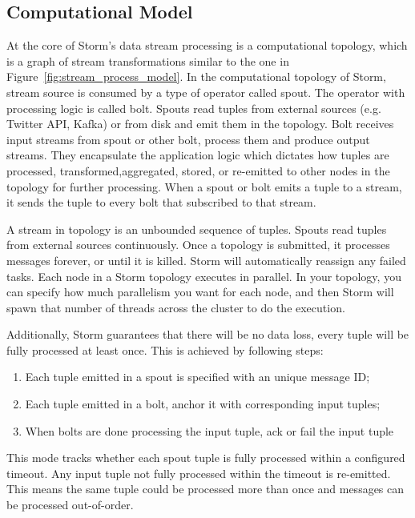 \subsection{Computational Model}

At the core of Storm's data stream processing is a computational topology, which is a graph of stream transformations similar to the one in Figure~\ref{fig:stream_process_model}. In the computational topology of Storm, stream source is consumed by a type of operator called spout. The operator with processing logic is called bolt. Spouts read tuples from external sources (e.g. Twitter API, Kafka) or from disk and emit them in the topology. Bolt receives input streams from spout or other bolt, process them and produce output streams. They encapsulate the application logic which dictates how tuples are processed, transformed,aggregated, stored, or re-emitted to other nodes in the topology for further processing. When a spout or bolt emits a tuple to a stream, it sends the tuple to every bolt that subscribed to that stream.

A stream in topology is an unbounded sequence of tuples. Spouts read tuples from external sources continuously. Once a topology is submitted, it processes messages forever, or until it is killed. Storm will automatically reassign any failed tasks. Each node in a Storm topology executes in parallel. In your topology, you can specify how much parallelism you want for each node, and then Storm will spawn that number of threads across the cluster to do the execution. 

Additionally, Storm guarantees that there will be no data loss, every tuple will be fully processed at least once. This is achieved by following steps:

\begin{enumerate}
\item Each tuple emitted in a spout is specified with an unique message ID;
\item Each tuple emitted in a bolt, anchor it with corresponding input tuples; 
\item When bolts are done processing the input tuple, ack or fail the input tuple
\end{enumerate}

This mode tracks whether each spout tuple is fully processed within a configured timeout. Any input tuple not fully processed within the timeout is re-emitted. This means the same tuple could be processed more than once and messages can be processed out-of-order. 


